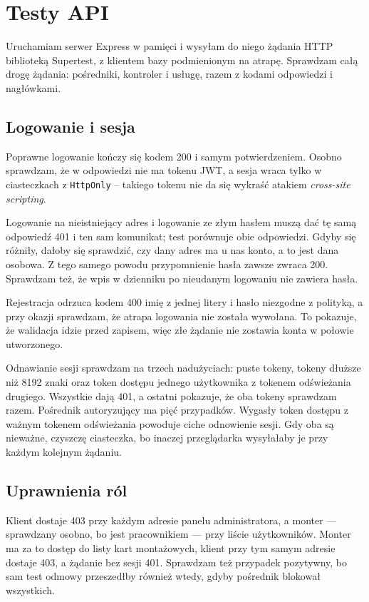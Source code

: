 \section{Testy API}
\label{sec:testy-api}

Uruchamiam serwer Express w pamięci i wysyłam do niego żądania HTTP biblioteką Supertest, z klientem bazy podmienionym na atrapę. Sprawdzam całą drogę żądania: pośredniki, kontroler i usługę, razem z kodami odpowiedzi i nagłówkami.

\subsection{Logowanie i sesja}
\label{ssec:uwierzytelnianie}

Poprawne logowanie kończy się kodem 200 i samym potwierdzeniem. Osobno sprawdzam, że w odpowiedzi nie ma tokenu JWT, a sesja wraca tylko w ciasteczkach z \texttt{HttpOnly} -- takiego tokenu nie da się wykraść atakiem \textit{cross-site scripting}.

Logowanie na nieistniejący adres i logowanie ze złym hasłem muszą dać tę samą odpowiedź 401 i ten sam komunikat; test porównuje obie odpowiedzi. Gdyby się różniły, dałoby się sprawdzić, czy dany adres ma u nas konto, a to jest dana osobowa. Z tego samego powodu przypomnienie hasła zawsze zwraca 200. Sprawdzam też, że wpis w dzienniku po nieudanym logowaniu nie zawiera hasła.

Rejestracja odrzuca kodem 400 imię z jednej litery i hasło niezgodne z polityką, a przy okazji sprawdzam, że atrapa logowania nie została wywołana. To pokazuje, że walidacja idzie przed zapisem, więc złe żądanie nie zostawia konta w połowie utworzonego.

Odnawianie sesji sprawdzam na trzech nadużyciach: puste tokeny, tokeny dłuższe niż 8192 znaki oraz token dostępu jednego użytkownika z tokenem odświeżania drugiego. Wszystkie dają 401, a ostatni pokazuje, że oba tokeny sprawdzam razem. Pośrednik autoryzujący ma pięć przypadków. Wygasły token dostępu z ważnym tokenem odświeżania powoduje ciche odnowienie sesji. Gdy oba są nieważne, czyszczę ciasteczka, bo inaczej przeglądarka wysyłałaby je przy każdym kolejnym żądaniu.

\subsection{Uprawnienia ról}
\label{ssec:autoryzacja-role}

Klient dostaje 403 przy każdym adresie panelu administratora, a monter — sprawdzany osobno, bo jest pracownikiem — przy liście użytkowników. Monter ma za to dostęp do listy kart montażowych, klient przy tym samym adresie dostaje 403, a żądanie bez sesji 401. Sprawdzam też przypadek pozytywny, bo sam test odmowy przeszedłby również wtedy, gdyby pośrednik blokował wszystkich.

